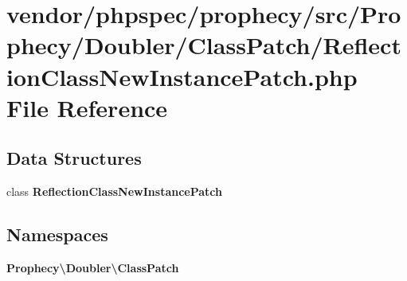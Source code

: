 \section{vendor/phpspec/prophecy/src/\+Prophecy/\+Doubler/\+Class\+Patch/\+Reflection\+Class\+New\+Instance\+Patch.php File Reference}
\label{_reflection_class_new_instance_patch_8php}
\subsection*{Data Structures}
\begin{DoxyCompactItemize}
\item 
class {\bf Reflection\+Class\+New\+Instance\+Patch}
\end{DoxyCompactItemize}
\subsection*{Namespaces}
\begin{DoxyCompactItemize}
\item 
 {\bf Prophecy\textbackslash{}\+Doubler\textbackslash{}\+Class\+Patch}
\end{DoxyCompactItemize}
